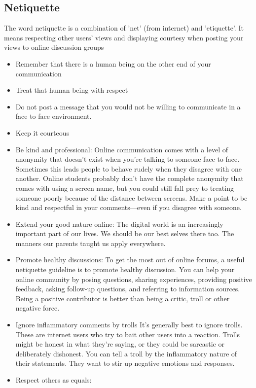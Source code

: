 \documentclass{article}
\begin{document}
 \subsection{Netiquette}
 The word netiquette is a combination of ’net’ (from internet) and ’etiquette’. It means respecting other users’ views and displaying 
 courtesy when posting your views to online discussion groups 
 \begin{itemize}
    \item Remember that there is a human being on the other end of your communication
    \item Treat that human being with respect
    \item Do not post a message that you would not be willing to communicate in a face to face environment.
    \item Keep it courteous
    \item Be kind and professional:  Online communication comes with a level of anonymity that doesn’t exist when you’re talking to someone face-to-face. 
    Sometimes this leads people to behave rudely when they disagree with one another. Online students probably don’t have the complete anonymity that comes with using a screen name, but you could still fall prey to treating someone poorly because of the distance between screens. Make a point to be kind and respectful in your comments—even if you disagree with someone.
    \item Extend your good nature online: The digital world is an increasingly important part of our lives. We should be our best selves there too. The manners our parents taught us apply everywhere.
    \item Promote healthy discussions: 
    To get the most out of online forums, a useful netiquette guideline is to promote healthy discussion. You can help your online community by posing questions, sharing experiences, providing positive feedback, asking follow-up questions, and referring to information sources. Being a positive contributor is better than being a critic, troll or other negative force.
    \item Ignore inflammatory comments by trolls
    It's generally best to ignore trolls. These are internet users who try to bait other users into a reaction. Trolls might be honest in what they're saying, or they could be sarcastic or deliberately dishonest. You can tell a troll by the inflammatory nature of their statements. They want to stir up negative emotions and responses.
    \item  Respect others as equals:

\end{itemize}
\end{document}
